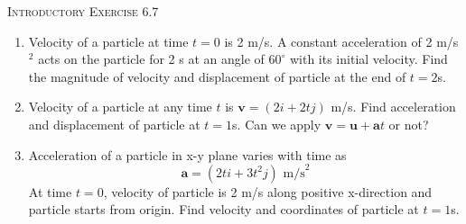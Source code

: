 \documentclass{article}
\begin{document}
\pagebreak
\begin{center}
    \textsc{Introductory Exercise 6.7}
\end{center}
\begin{enumerate}
    \item Velocity of a particle at time \( t = 0 \) is 2 m/s. A constant acceleration of 2 m/s\(^2\) acts on the particle for 2 s at an angle of \( 60^\circ \) with its initial velocity. Find the magnitude of velocity and displacement of particle at the end of \( t = 2 \)s.
    \item Velocity of a particle at any time \( t \) is \( \mathbf{v} = (2i + 2tj) \) m/s. Find acceleration and displacement of particle at \( t = 1 \)s. Can we apply \( \mathbf{v} = \mathbf{u} + \mathbf{a}t \) or not?
    \item Acceleration of a particle in x-y plane varies with time as 
    \[
    \mathbf{a} = (2ti + 3t^2j) \text{ m/s}^2
    \]
    At time \( t = 0 \), velocity of particle is 2 m/s along positive x-direction and particle starts from origin. Find velocity and coordinates of particle at \( t = 1 \)s.
\end{enumerate}
\end{document}
